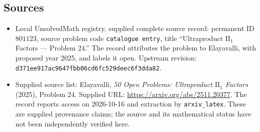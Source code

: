 \documentclass[11pt]{article}
\begin{document}
\subsection{Sources}
\begin{itemize}
\item Local UnsolvedMath registry, supplied complete source record: permanent ID \(801123\), source problem code \texttt{catalogue entry}, title ``Ultraproduct \(\mathrm{II}_1\) Factors --- Problem 24.'' The record attributes the problem to Elayavalli, with proposed year 2025, and labels it open. Upstream revision: \texttt{d371ee917ac9647fbb06cd6fc529deec6f3dda82}.
\item Supplied source list: Elayavalli, \emph{50 Open Problems: Ultraproduct \(\mathrm{II}_1\) Factors} (2025), Problem 24. Supplied URL: \url{https://arxiv.org/abs/2511.20377}. The record reports access on 2026-10-16 and extraction by \texttt{arxiv\_latex}. These are supplied provenance claims; the source and its mathematical status have not been independently verified here.
\end{itemize}
\end{document}
